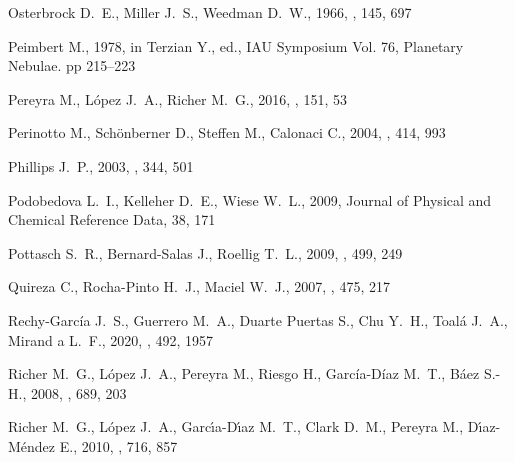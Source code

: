 \documentclass[useAMS, usenatbib]{mnras}
\begin{document}
\begin{thebibliography}{}
{Osterbrock} D.~E.,  {Miller} J.~S.,   {Weedman} D.~W.,  1966, \apj, 145, 697

{Peimbert} M.,  1978, in {Terzian} Y.,  ed.,  IAU Symposium Vol. 76, Planetary
  Nebulae. pp 215--223

{Pereyra} M.,  {López} J.~A.,   {Richer} M.~G.,  2016, \aj, 151, 53

{Perinotto} M.,  {Schönberner} D.,  {Steffen} M.,   {Calonaci} C.,  2004,
  \aap, 414, 993

{Phillips} J.~P.,  2003, \mnras, 344, 501

{Podobedova} L.~I.,  {Kelleher} D.~E.,   {Wiese} W.~L.,  2009, Journal of
  Physical and Chemical Reference Data, 38, 171

{Pottasch} S.~R.,  {Bernard-Salas} J.,   {Roellig} T.~L.,  2009, \aap, 499, 249

{Quireza} C.,  {Rocha-Pinto} H.~J.,   {Maciel} W.~J.,  2007, \aap, 475, 217

{Rechy-García} J.~S.,  {Guerrero} M.~A.,  {Duarte Puertas} S.,  {Chu} Y.~H.,
  {Toalá} J.~A.,   {Mirand a} L.~F.,  2020, \mnras, 492, 1957

{Richer} M.~G.,  {López} J.~A.,  {Pereyra} M.,  {Riesgo} H.,  {García-Díaz}
  M.~T.,   {Báez} S.-H.,  2008, \apj, 689, 203

{Richer} M.~G.,  {López} J.~A.,  {Garc{\'{\i}}a-D{\'{\i}}az} M.~T.,  {Clark}
  D.~M.,  {Pereyra} M.,   {D{\'{\i}}az-Méndez} E.,  2010, \apj, 716, 857


\end{thebibliography}
\end{document}
